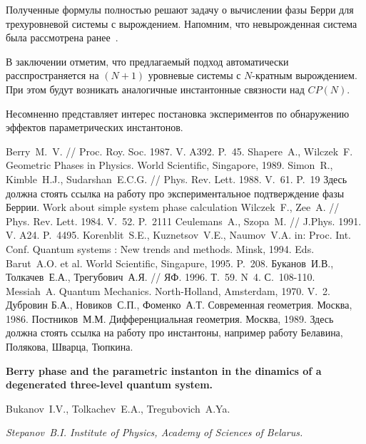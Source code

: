 \documentclass[a4paper]{article}
\begin{document}
Полученные формулы полностью решают задачу о вычислении
фазы Берри для трехуровневой системы с вырождением.
Напомним, что невырожденная система была рассмотрена
ранее~\cite{PreviousWork}.

В заключении отметим, что предлагаемый подход
автоматически расспространяется на $(N + 1)$ уровневые системы с
$N$-кратным вырождением. При этом будут возникать
аналогичные инстантонные связности над $CP(N)$.

Несомненно представляет интерес постановка экспериментов
по обнаружению эффектов параметрических инстантонов.

\begin{thebibliography}{10}

 Berry~M.~V. // Proc. Roy. Soc. 1987. V. A392. P.~45.
 Shapere~A., Wilczek~F. Geometric Phases in Physics. World Scientific,
 Singapore, 1989.
 Simon~R., Kimble~H.J., Sudarshan~E.C.G.
 // Phys. Rev. Lett. 1988. V.~61. P.~19
 Здесь должна стоять ссылка на работу про экспериментальное
 подтверждение фазы Беррии.
 Work about simple system phase calculation
 Wilczek~F., Zee~A. // Phys. Rev. Lett. 1984. V.~52. P.~2111
 Ceulemans~A., Szopa~M. // J.Phys. 1991. V. A24. P.~4495.
 Korenblit~S.E., Kuznetsov~V.E., Naumov~V.A. in: Proc. Int. Conf.
 Quantum systems : New trends and methods. Minsk, 1994.
 Eds. Barut~A.O. et al. World Scientific, Singapure, 1995. P.~208.
 Буканов~И.В., Толкачев~Е.А., Трегубович~А.Я.
 // ЯФ. 1996. Т.~59. N~4. С.~108-110.
 Messiah~A. Quantum Mechanics. North-Holland, Amsterdam, 1970. V.~2.
 Дубровин Б.А., Новиков~С.П., Фоменко~А.Т.
 Современная геометрия. Москва, 1986.
 Постников~М.М. Дифференциальная геометрия. Москва, 1989.
 Здесь должна стоять ссылка на работу про инстантоны, например
работу Белавина, Полякова, Шварца, Тюпкина.
\end{thebibliography}

\pagebreak

\begin{center}

{\large\bf Berry phase and the parametric instanton in the dinamics of
a degenerated three-level quantum system. }

Bukanov~I.V., Tolkachev~E.A., Tregubovich~A.Ya.

{\it Stepanov~B.I. Institute of Physics, Academy of Sciences of Belarus.}

\end{center}
\end{document}
